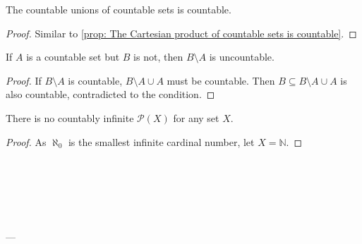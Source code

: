 \begin{proposition}
	\label{prop: The countable union of countable sets is countable}
    The countable unions of countable sets is countable.
    
    \begin{proof}
        Similar to \ref{prop: The Cartesian product of countable sets is countable}.
    \end{proof}
\end{proposition}


\begin{proposition}
    If $A$ is a countable set but $B$ is not, then $B \setminus A$ is uncountable.

    \begin{proof}
        If $B \setminus A$ is countable, $B \setminus A \cup A$ must be countable. Then $B \subseteq B \setminus A \cup A$ is also countable, contradicted to the condition.
    \end{proof}
\end{proposition}


\begin{proposition}
	There is no countably infinite $\mathcal P(X)$ for any set $X$.
	
	\begin{proof}
		As $\aleph_0$ is the smallest infinite cardinal number, let $X = \mathbb N$.
		
	\end{proof}
\end{proposition}


\

\

\

---









